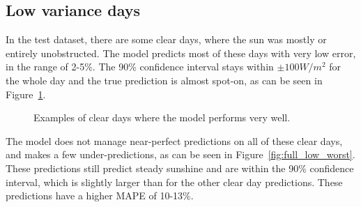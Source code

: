 \subsection{Low variance days}
In the test dataset, there are some clear days, where the sun was mostly or entirely unobstructed. The model predicts most of these days with very low error, in the range of 2-5\%. The 90\% confidence interval stays within $\pm100 W/m^2$ for the whole day and the true prediction is almost spot-on, as can be seen in Figure~\ref{fig:full_low_best}.
\begin{figure}[ht!]
    \centering
    \qquad
    \qquad
    \caption{Examples of clear days where the model performs very well.
    \label{fig:full_low_best}}
\end{figure}


The model does not manage near-perfect predictions on all of these clear days, and makes a few under-predictions, as can be seen in Figure~\ref{fig:full_low_worst}.
These predictions still predict steady sunshine and are within the 90\% confidence interval, which is slightly larger than for the other clear day predictions. These predictions have a higher MAPE of 10-13\%.



